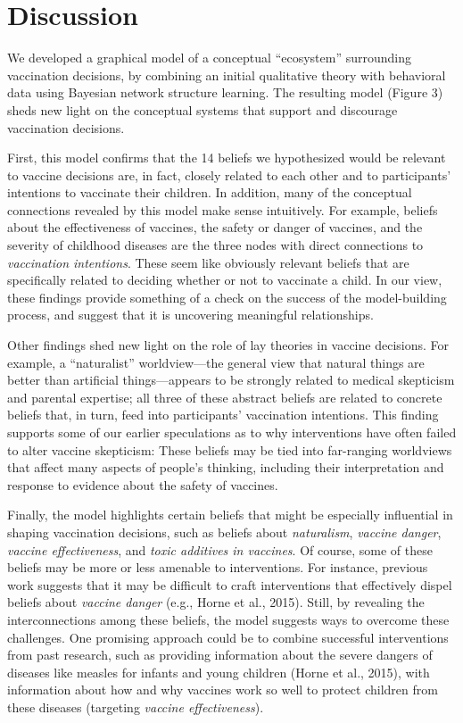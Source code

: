 \documentclass[10pt, letterpaper]{article}
\begin{document}
\section{Discussion}\label{discussion}

We developed a graphical model of a conceptual ``ecosystem'' surrounding
vaccination decisions, by combining an initial qualitative theory with
behavioral data using Bayesian network structure learning. The resulting
model (Figure 3) sheds new light on the conceptual systems that support
and discourage vaccination decisions.

First, this model confirms that the 14 beliefs we hypothesized would be
relevant to vaccine decisions are, in fact, closely related to each
other and to participants' intentions to vaccinate their children. In
addition, many of the conceptual connections revealed by this model make
sense intuitively. For example, beliefs about the effectiveness of
vaccines, the safety or danger of vaccines, and the severity of
childhood diseases are the three nodes with direct connections to
\emph{vaccination intentions}. These seem like obviously relevant
beliefs that are specifically related to deciding whether or not to
vaccinate a child. In our view, these findings provide something of a
check on the success of the model-building process, and suggest that it
is uncovering meaningful relationships.

Other findings shed new light on the role of lay theories in vaccine
decisions. For example, a ``naturalist'' worldview---the general view
that natural things are better than artificial things---appears to be
strongly related to medical skepticism and parental expertise; all three
of these abstract beliefs are related to concrete beliefs that, in turn,
feed into participants' vaccination intentions. This finding supports
some of our earlier speculations as to why interventions have often
failed to alter vaccine skepticism: These beliefs may be tied into
far-ranging worldviews that affect many aspects of people's thinking,
including their interpretation and response to evidence about the safety
of vaccines.

Finally, the model highlights certain beliefs that might be especially
influential in shaping vaccination decisions, such as beliefs about
\emph{naturalism}, \emph{vaccine danger}, \emph{vaccine effectiveness},
and \emph{toxic additives in vaccines}. Of course, some of these beliefs
may be more or less amenable to interventions. For instance, previous
work suggests that it may be difficult to craft interventions that
effectively dispel beliefs about \emph{vaccine danger} (e.g., Horne et
al., 2015). Still, by revealing the interconnections among these
beliefs, the model suggests ways to overcome these challenges. One
promising approach could be to combine successful interventions from
past research, such as providing information about the severe dangers of
diseases like measles for infants and young children (Horne et al.,
2015), with information about how and why vaccines work so well to
protect children from these diseases (targeting \emph{vaccine
effectiveness}).
\end{document}
